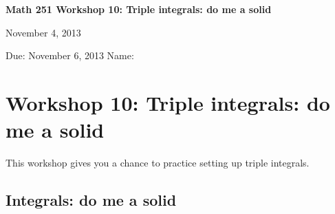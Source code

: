 \documentclass[12pt]{exam}
\theoremstyle{definition}
\begin{document}
\noindent
\textbf{{\large Math 251 \hfill Workshop 10: Triple integrals: do me a solid}}

\noindent
November 4, 2013 

\noindent
Due: November 6, 2013 \hfill Name: \underline{\hspace{3in}} 

\noindent

\section{Workshop 10: Triple integrals: do me a solid}

This workshop gives you a chance to practice setting up triple
integrals.

\subsection{Integrals: do me a solid}
\end{document}

